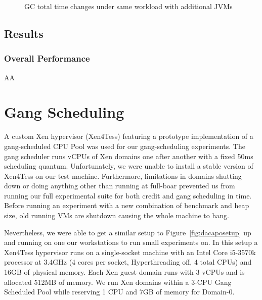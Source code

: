 \documentclass{sig-alternate}
\begin{document}
\begin{figure}
\centering
{}
\caption{GC total time changes under same workload with additional JVMs}
\label{fig:cassandragc}
\end{figure}

\subsection{Results}

\subsubsection{Overall Performance}
AA
%


\section{Gang Scheduling}
A custom Xen hypervisor (Xen4Tess) featuring a prototype implementation of a gang-scheduled CPU Pool was used for our gang-scheduling experiments. The gang scheduler runs vCPUs of Xen domains one after another with a fixed 50ms scheduling quantum. Unfortunately, we were unable to install a stable version of Xen4Tess on our test machine. Furthermore, limitations in domains shutting down or doing anything other than running at full-boar prevented us from running our full experimental suite for both credit and gang scheduling in time. Before running an experiment with a new combination of benchmark and heap size, old running VMs are shutdown causing the whole machine to hang.

Nevertheless, we were able to get a similar setup to Figure~\ref{fig:dacaposetup} up and running on one our workstations to run small experiments on. In this setup a Xen4Tess hypervisor runs on a single-socket machine with an Intel Core i5-3570k processor at 3.4GHz (4 cores per socket, Hyperthreading off,  4 total CPUs) and 16GB of physical memory. Each Xen guest domain runs with 3 vCPUs and is allocated 512MB of memory. We run Xen domains within a 3-CPU Gang Scheduled Pool while reserving 1 CPU and 7GB of memory for Domain-0.
\end{document}
